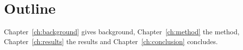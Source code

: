 \section{Outline}
Chapter~\ref{ch:background} gives background, Chapter~\ref{ch:method} the method,
Chapter~\ref{ch:results} the results and Chapter~\ref{ch:conclusion} concludes.
